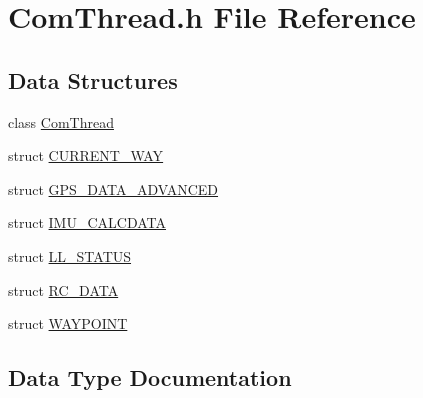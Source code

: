 \hypertarget{a00004}{\section{Com\-Thread.\-h File Reference}
\label{a00004}
}
\subsection*{Data Structures}
\begin{DoxyCompactItemize}
\item 
class \hyperlink{a00002}{Com\-Thread}
\item 
struct \hyperlink{a00004_d1/d84/a00052}{C\-U\-R\-R\-E\-N\-T\-\_\-\-W\-A\-Y}
\item 
struct \hyperlink{a00004_d3/d32/a00105}{G\-P\-S\-\_\-\-D\-A\-T\-A\-\_\-\-A\-D\-V\-A\-N\-C\-E\-D}
\item 
struct \hyperlink{a00004_d7/d70/a00106}{I\-M\-U\-\_\-\-C\-A\-L\-C\-D\-A\-T\-A}
\item 
struct \hyperlink{a00004_df/d98/a00107}{L\-L\-\_\-\-S\-T\-A\-T\-U\-S}
\item 
struct \hyperlink{a00004_d1/dd6/a00108}{R\-C\-\_\-\-D\-A\-T\-A}
\item 
struct \hyperlink{a00004_dd/d42/a00109}{W\-A\-Y\-P\-O\-I\-N\-T}
\end{DoxyCompactItemize}


\subsection{Data Type Documentation}
\label{d1/d84/a00052}
\hypertarget{a00004_d1/d84/a00052}{}
